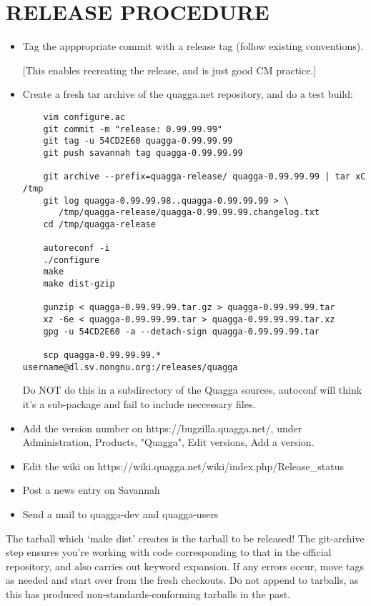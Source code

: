 \documentclass[oneside]{article}
\begin{document}
\section{RELEASE PROCEDURE}

\begin{itemize}
\item Tag the apppropriate commit with a release tag (follow existing
  conventions).
  
  [This enables recreating the release, and is just good CM practice.]

\item Create a fresh tar archive of the quagga.net repository, and do a test
  build:

  \begin{verbatim}
    vim configure.ac
    git commit -m "release: 0.99.99.99"
    git tag -u 54CD2E60 quagga-0.99.99.99
    git push savannah tag quagga-0.99.99.99

    git archive --prefix=quagga-release/ quagga-0.99.99.99 | tar xC /tmp
    git log quagga-0.99.99.98..quagga-0.99.99.99 > \
       /tmp/quagga-release/quagga-0.99.99.99.changelog.txt
    cd /tmp/quagga-release

    autoreconf -i
    ./configure
    make
    make dist-gzip

    gunzip < quagga-0.99.99.99.tar.gz > quagga-0.99.99.99.tar
    xz -6e < quagga-0.99.99.99.tar > quagga-0.99.99.99.tar.xz
    gpg -u 54CD2E60 -a --detach-sign quagga-0.99.99.99.tar

    scp quagga-0.99.99.99.* username@dl.sv.nongnu.org:/releases/quagga
  \end{verbatim}

  Do NOT do this in a subdirectory of the Quagga sources, autoconf will think
  it's a sub-package and fail to include neccessary files.

\item Add the version number on https://bugzilla.quagga.net/, under
  Administration, Products, "Quagga", Edit versions, Add a version.
\item Edit the wiki on https://wiki.quagga.net/wiki/index.php/Release\_status
\item Post a news entry on Savannah
\item Send a mail to quagga-dev and quagga-users
\end{itemize}

The tarball which `make dist' creates is the tarball to be released! The
git-archive step ensures you're working with code corresponding to that in
the official repository, and also carries out keyword expansion. If any
errors occur, move tags as needed and start over from the fresh checkouts.
Do not append to tarballs, as this has produced non-standards-conforming
tarballs in the past.
\end{document}
